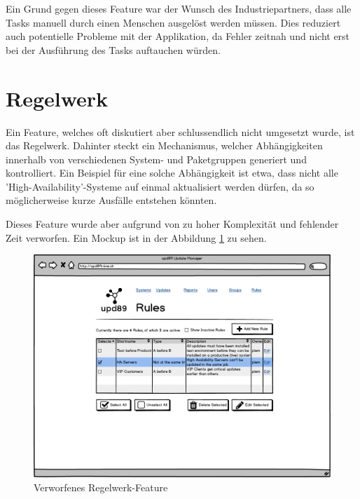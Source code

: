 Ein Grund gegen dieses Feature war der Wunsch des Industriepartners, dass alle Tasks manuell durch einen Menschen ausgelöst werden müssen. Dies reduziert auch potentielle Probleme mit der Applikation, da Fehler zeitnah und nicht erst bei der Ausführung des Tasks auftauchen würden.

\section{Regelwerk}
\label{sec:ausblick:regelwerk}

Ein Feature, welches oft diskutiert aber schlussendlich nicht umgesetzt wurde, ist das Regelwerk. Dahinter steckt ein Mechanismus, welcher Abhängigkeiten innerhalb von verschiedenen System- und Paketgruppen generiert und kontrolliert. Ein Beispiel für eine solche Abhängigkeit ist etwa, dass nicht alle 'High-Availability'-Systeme auf einmal aktualisiert werden dürfen, da so möglicherweise kurze Ausfälle entstehen könnten. 

Dieses Feature wurde aber aufgrund von zu hoher Komplexität und fehlender Zeit verworfen. Ein Mockup ist in der Abbildung \ref{fig:ergebnis:rules} zu sehen.

\begin{figure}[H]
	\centering
	\includegraphics[width=\linewidth]{files/mockups/rules}
	\caption{Verworfenes Regelwerk-Feature}
	\label{fig:ergebnis:rules}
\end{figure}
